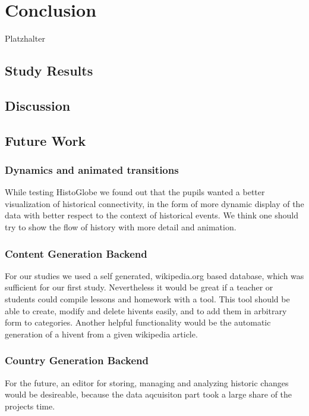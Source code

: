 \section{Conclusion}
Platzhalter\\

\subsection{Study Results}
\subsection{Discussion}
\subsection{Future Work}
\subsubsection{Dynamics and animated transitions} %
\label{sub:dynamics_and_animated_transitions}
While testing HistoGlobe we found out that the pupils wanted a better visualization of historical connectivity, in the form of  more dynamic display of the data with better respect to the context of historical events. We think one should try to show the flow of history with more detail and animation.




\subsubsection{Content Generation Backend} %
\label{sub:content_generation_backend}

For our studies we used a self generated, wikipedia.org based database, which was sufficient for our first study. Nevertheless it would be great if a teacher or students could compile lessons and homework with a tool. This tool should be able to create, modify and delete hivents easily, and to add them in arbitrary form to categories.
Another helpful functionality would be the automatic generation of a hivent from a given wikipedia article.


\subsubsection{Country Generation Backend} %
\label{sub:country_generation_backend}
For the future, an editor for storing, managing and analyzing historic changes would be desireable, because the data aqcuisiton part took a large share of the projects time.

